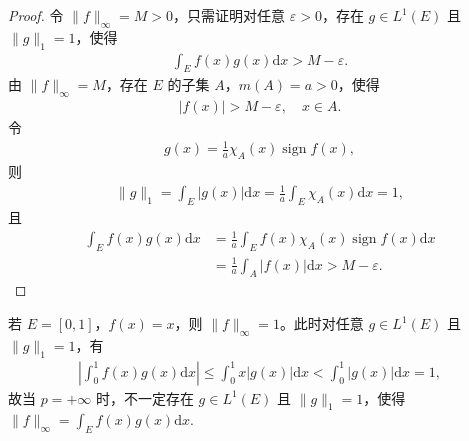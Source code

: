 \documentclass[../../main.tex]{subfiles}%
\begin{document}
\begin{proof}

令 $\|f\|_\infty = M>0$，只需证明对任意 $\varepsilon>0$，存在 $g\in L^1(E)$ 且 $\|g\|_1=1$，使得
\begin{align*}
\int_E f(x)g(x)\mathrm{d}x > M - \varepsilon.
\end{align*}
由 $\|f\|_\infty=M$，存在 $E$ 的子集 $A$，$m(A)=a>0$，使得
\begin{align*}
|f(x)| > M - \varepsilon, \quad x\in A.
\end{align*}
令
\begin{align*}
g(x) = \frac{1}{a} \chi_A(x) \operatorname{sign} f(x),
\end{align*}
则
\begin{align*}
\|g\|_1 = \int_E |g(x)|\mathrm{d}x = \frac{1}{a} \int_E \chi_A(x)\mathrm{d}x = 1,
\end{align*}
且
\begin{align*}
\int_E f(x)g(x)\mathrm{d}x &= \frac{1}{a} \int_E f(x)\chi_A(x)\operatorname{sign} f(x)\mathrm{d}x \\
&= \frac{1}{a} \int_A |f(x)|\mathrm{d}x > M - \varepsilon.
\end{align*}

\end{proof}

\begin{remark}
若 $E=[0,1]$，$f(x)=x$，则 $\|f\|_\infty=1$。此时对任意 $g\in L^1(E)$ 且 $\|g\|_1=1$，有
\begin{align*}
\left| \int_0^1 f(x)g(x)\mathrm{d}x \right| \leqslant \int_0^1 x|g(x)|\mathrm{d}x < \int_0^1 |g(x)|\mathrm{d}x = 1,
\end{align*}
故当 $p=+\infty$ 时，不一定存在 $g\in L^1(E)$ 且 $\|g\|_1=1$，使得 $\|f\|_\infty = \int_E f(x)g(x)\mathrm{d}x$.
\end{remark}
\end{document}

